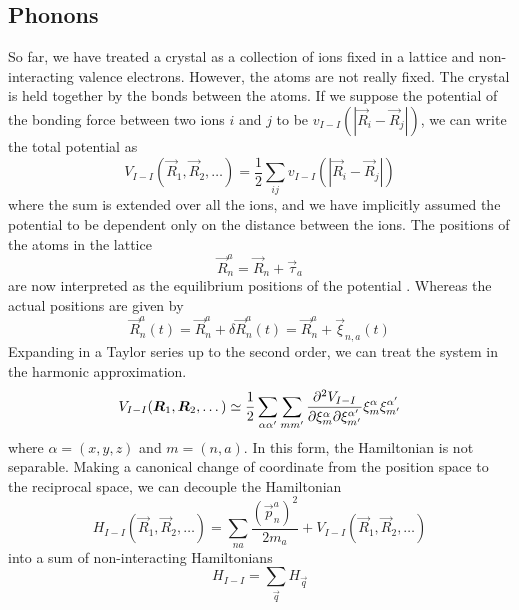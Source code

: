 \subsection{Phonons} \label{sec:phonons}
So far, we have treated a crystal as a collection of ions fixed in a lattice and non-interacting valence electrons. However, the atoms are not really fixed. The crystal is held together by the bonds between the atoms. If we suppose the potential of the bonding force between two ions $i$ and $j$ to be $v_{I-I}(|\vec{R}_i - \vec{R}_j|)$, we can write the total potential as
\begin{equation} \label{eq:ion_ion_potential}
    V_{I-I}(\vec{R}_1, \vec{R}_2, \dots) = \frac{1}{2} \sum_{ij} v_{I-I}(|\vec{R}_i - \vec{R}_j|)
\end{equation}
where the sum is extended over all the ions, and we have implicitly assumed the potential to be dependent only on the distance between the ions. The positions of the atoms in the lattice
\begin{equation}
    \vec{R}_n^a = \vec{R}_n + \vec{\tau}_a
\end{equation}
are now interpreted as the equilibrium positions of the potential . Whereas the actual positions are given by
\begin{equation} \label{eq:atom_position_perturbed}
    \vec{R}_n^a(t) = \vec{R}_n^a + \delta \vec{R}_n^a(t) = \vec{R}_n^a + \vec{\xi}_{n,a}(t)
\end{equation}
Expanding  in a Taylor series up to the second order, we can treat the system in the harmonic approximation.
\begin{equation}
    V_{I-I}(\mathbf{\boldsymbol{R}}_1, \mathbf{\boldsymbol{R}}_2, \dots) \simeq \frac{1}{2} \sum_{\alpha \alpha'} \sum_{m m'} \frac{\partial^2 V_{I-I}}{\partial \xi_m^\alpha \partial \xi_{m'}^{\alpha'}} \xi_m^\alpha \xi_{m'}^{\alpha'}
\end{equation}
where $\alpha = (x,y,z)$ and $m = (n,a)$.
In this form, the Hamiltonian is not separable. Making a canonical change of coordinate from the position space to the reciprocal space, we can decouple the Hamiltonian
\begin{equation} \label{eq:lattice_hamiltonian}
    H_{I-I}(\vec{R}_1, \vec{R}_2, \dots) = \sum_{na} \frac{(\vec{p}_n^a)^2}{2m_a} + V_{I-I}(\vec{R}_1, \vec{R}_2, \dots)
\end{equation}
into a sum of non-interacting Hamiltonians
\begin{equation}
    H_{I-I} = \sum_\vec{q} H_\vec{q}
\end{equation}
